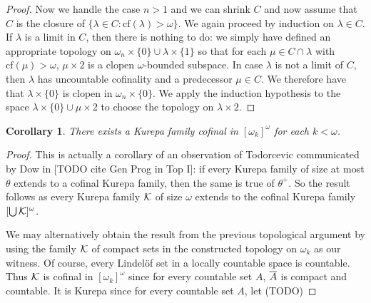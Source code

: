 \documentclass{amsart}
\theoremstyle{plain}
\newtheorem{corollary}[theorem]{Corollary}
\theoremstyle{definition}
\theoremstyle{remark}
\theoremstyle{plain}
\theoremstyle{definition}
\theoremstyle{remark}
\begin{document}
\begin{proof}
                Now we handle the case $n>1$ and we can shrink $C$
                and now assume
                that $C$ is the closure of $\{\lambda\in C : \mbox{cf}(\lambda)>\omega\}$.
                We again proceed by induction on $\lambda\in C$.  If
                $\lambda$ is a limit in $C$, then there is nothing to do: we
                simply have defined an appropriate topology on
                $\omega_n\times  \{0\}\cup \lambda\times \{1\}$ so that
                for each $\mu\in C\cap \lambda$ with $\mbox{cf}(\mu)>\omega$,
                 $\mu\times 2$ is a clopen $\omega$-bounded subspace.
                In case $\lambda$ is not a limit of $C$, then $\lambda$
                has uncountable cofinality and a predecessor $\mu\in C$.
                We therefore have that $\lambda\times\{0\}$ is clopen
                in $\omega_n\times \{0\}$.
                 We apply the induction hypothesis
                to the space $\lambda\times \{0\} \cup \mu\times 2$ to choose
                the topology on $\lambda\times 2$.


            \end{proof}



  \begin{corollary}
    There exists a Kurepa family cofinal in \([\omega_k]^\omega\)
    for each \(k<\omega\).
  \end{corollary}

  \begin{proof}
    This is actually a corollary of an observation of Todorcevic communicated
    by Dow in [TODO cite Gen Prog in Top I]:
    if every Kurepa family of size at most \(\theta\)
    extends to a cofinal Kurepa family, then the same is true of \(\theta^+\).
    So the result follows as
    every Kurepa family \(\mathcal{K}\) of size \(\omega\) extends to
    the cofinal Kurepa family \([\bigcup\mathcal{K}]^\omega\).

    We may alternatively
    obtain the result from the previous topological argument by using the family
    \(\mathcal{K}\) of compact sets in the constructed topology on
    \(\omega_k\) as our witness. Of course, every Lindel\"of set in
    a locally countable space is countable. Thus \(\mathcal{K}\)
    is cofinal in \([\omega_k]^\omega\)
    since for every countable set \(A\), \(\overline{A}\) is compact and countable.
    It is Kurepa since for every countable set \(A\), let (TODO)
  \end{proof}
\end{document}
